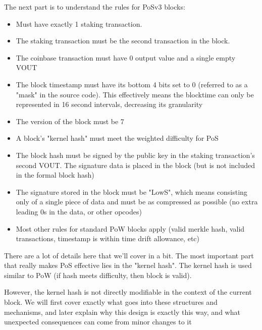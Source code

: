 The next part is to understand the rules for PoSv3 blocks:
\begin{itemize}
	\item Must have exactly 1 staking transaction.
	\item The staking transaction must be the second transaction in the block.
	\item The coinbase transaction must have 0 output value and a single empty VOUT
	\item The block timestamp must have its bottom 4 bits set to 0 (referred 
	to as a "mask" in the source code). This effectively means the blocktime 
	can only be represented in 16 second intervals, decreasing its granularity
	\item The version of the block must be 7
	\item A block's "kernel hash" must meet the weighted difficulty for PoS
	\item The block hash must be signed by the public key in the staking 
	transaction's second VOUT. The signature data is placed in the block 
	(but is not included in the formal block hash)
	\item The signature stored in the block must be "LowS", which means 
	consisting only of a single piece of data and must be as compressed 
	as possible (no extra leading 0s in the data, or other opcodes)
	\item Most other rules for standard PoW blocks apply (valid merkle 
	hash, valid transactions, timestamp is within time drift allowance, etc)
\end{itemize}



There are a lot of details here that we'll cover in a bit. The most important
part that really makes PoS effective lies in the "kernel hash". The kernel
hash is used similar to PoW (if hash meets difficulty, then block is valid).



However, the kernel hash is not directly modifiable in the context of the
current block. We will first cover exactly what goes into these structures
and mechanisms, and later explain why this design is exactly this way, and
what unexpected consequences can come from minor changes to it
